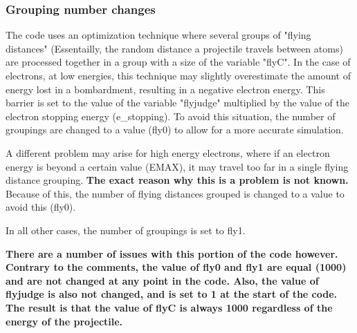 \documentclass[10pt, reqno]{exam}
\begin{document}
\subsubsection{Grouping number changes}

The code uses an optimization technique where several groups of "flying distances" (Essentailly, the random distance a projectile travels between atoms) are processed together in a group with a size of the variable "flyC". In the case of electrons, at low energies, this technique may slightly overestimate the amount of energy lost in a bombardment, resulting in a negative electron energy. This barrier is set to the value of the variable "flyjudge" multiplied by the value of the electron stopping energy (e\_stopping). To avoid this situation, the number of groupings are changed to a value (fly0) to allow for a more accurate simulation. \par

A different problem may arise for high energy electrons, where if an electron energy is beyond a certain value (EMAX), it may travel too far in a single flying distance grouping. \textbf{The exact reason why this is a problem is not known.} Because of this, the number of flying distances grouped is changed to a value to avoid this (fly0). \par

In all other cases, the number of groupings is set to fly1. \par

\textbf{There are a number of issues with this portion of the code however. Contrary to the comments, the value of fly0 and fly1 are equal (1000) and are not changed at any point in the code. Also, the value of flyjudge is also not changed, and is set to 1 at the start of the code. The result is that the value of flyC is always 1000 regardless of the energy of the projectile.}
\end{document}
